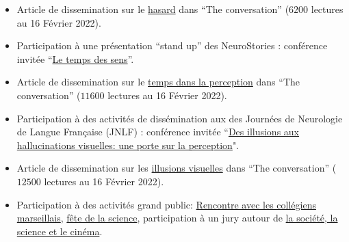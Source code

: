 \documentclass[10pt,french,a4paper,twoside]{article}%
\newcommand{\years}[1]{\marginpar{\textit{\scriptsize #1}}}
\begin{document}
\begin{itemize}

	\item Article de dissemination sur le \href{https://laurentperrinet.github.io/publication/perrinet-21-hasard/}{hasard} dans ``The conversation'' ($6200$ lectures au 16 Février 2022).

	\item Participation à une présentation ``stand up'' des NeuroStories : conférence invitée  ``\href{https://laurentperrinet.github.io/post/2019-10-07_neurostories/}{Le temps des sens}''.

	\item Article de dissemination sur le \href{https://laurentperrinet.github.io/publication/perrinet-19-temps/}{temps dans la perception} dans ``The conversation'' ($11600$ lectures au 16 Février 2022).

	\item Participation à des activités de dissémination aux des Journées de Neurologie de Langue Française (JNLF) : conférence invitée  ``\href{https://laurentperrinet.github.io/talk/2019-04-18-jnlf/}{Des illusions aux hallucinations visuelles: une porte sur la perception}".

	\item Article de dissemination sur les \href{https://theconversation.com/illusions-et-hallucinations-visuelles-une-porte-sur-la-perception-117389}{illusions visuelles} dans ``The conversation'' ($12500$ lectures au 16 Février 2022).

	\item Participation à des activités grand public: \href{https://laurentperrinet.github.io/talk/2019-01-10-polly-maggoo/}{Rencontre avec les collégiens marseillais}, \href{https://laurentperrinet.github.io/talk/2018-10-10-polly-maggoo/}{fête de la science}, participation à un jury autour de \href{https://laurentperrinet.github.io/talk/2017-11-17-festival-interferences/}{la société, la science et le cinéma}.


%
%
%

\end{itemize}
\end{document}
